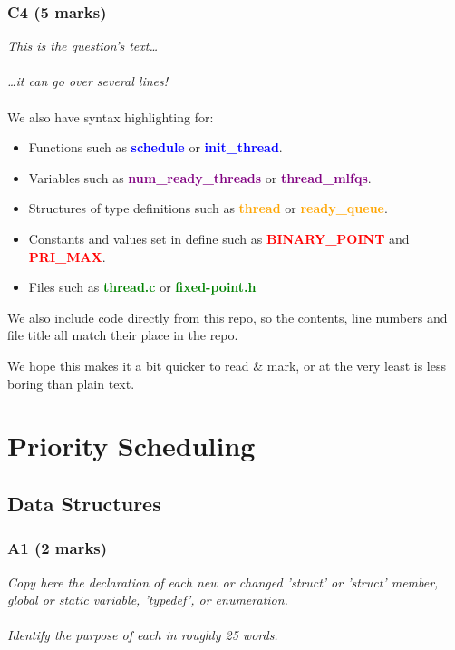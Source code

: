 \documentclass{report}
\newcommand{\question}[1]{\textit{#1} \\ }
\newcommand{\fun}[1]{\textcolor{blue}{\textbf{#1}}}
\newcommand{\file}[1]{\textcolor{green}{\textbf{#1}}}
\newcommand{\struct}[1]{\textcolor{orange}{\textbf{#1}}}
\newcommand{\var}[1]{\textcolor{purple}{\textbf{#1}}}
\newcommand{\const}[1]{\textcolor{red}{\textbf{#1}}}
\newcommand{\pintoscode}[4]{}
\begin{document}
            \subsubsection*{C4 (5 marks)}
            \question{This is the question's text\dots
            \\
            \\ \dots it can go over several lines!}
            \\ We also have syntax highlighting for:
            \begin{itemize}
                \item Functions such as \fun{schedule} or \fun{init\_thread}.
                \item Variables such as \var{num\_ready\_threads} or \var{thread\_mlfqs}.
                \item Structures of type definitions such as \struct{thread} or \struct{ready\_queue}.
                \item Constants and values set in define such as \const{BINARY\_POINT} and \const{PRI\_MAX}.
                \item Files such as \file{thread.c} or \file{fixed-point.h}
            \end{itemize}
            We also include code directly from this repo, so the contents, line numbers and file title all match their place in the repo.
            \pintoscode{163}{167}{thread.c}{thread.c}
            We hope this makes it a bit quicker to read \& mark, or at the very least is less boring than plain text.
    \section*{Priority Scheduling}
        \subsection*{Data Structures}
            \subsubsection*{A1  (2 marks) }
                \question{Copy here the declaration of each new or changed 'struct' or 'struct' member, global or static variable, 'typedef', or enumeration.  
                \\
                \\ Identify the purpose of each in roughly 25 words.}
                
                \pintoscode{91}{123}{thread.h}{thread.h}
\end{document}
